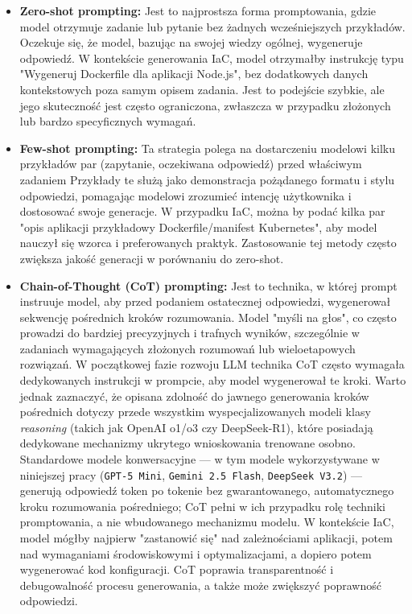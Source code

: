 \begin{itemize}
	\item \textbf{Zero-shot prompting:} Jest to najprostsza forma promptowania, gdzie model otrzymuje zadanie lub pytanie bez żadnych wcześniejszych przykładów. Oczekuje się, że model, bazując na swojej wiedzy ogólnej, wygeneruje odpowiedź. W kontekście generowania IaC, model otrzymałby instrukcję typu "Wygeneruj Dockerfile dla aplikacji Node.js", bez dodatkowych danych kontekstowych poza samym opisem zadania. Jest to podejście szybkie, ale jego skuteczność jest często ograniczona, zwłaszcza w przypadku złożonych lub bardzo specyficznych wymagań.
	\item \textbf{Few-shot prompting:} Ta strategia polega na dostarczeniu modelowi kilku przykładów par (zapytanie, oczekiwana odpowiedź) przed właściwym zadaniem \cite{brown_language_2020} Przykłady te służą jako demonstracja pożądanego formatu i stylu odpowiedzi, pomagając modelowi zrozumieć intencję użytkownika i dostosować swoje generacje. W przypadku IaC, można by podać kilka par "opis aplikacji \textrightarrow{} przykładowy Dockerfile/manifest Kubernetes", aby model nauczył się wzorca i preferowanych praktyk. Zastosowanie tej metody często zwiększa jakość generacji w porównaniu do zero-shot.
	\item \textbf{Chain-of-Thought (CoT) prompting:} Jest to technika, w której prompt instruuje model, aby przed podaniem ostatecznej odpowiedzi, wygenerował sekwencję pośrednich kroków rozumowania. Model "myśli na głos", co często prowadzi do bardziej precyzyjnych i trafnych wyników, szczególnie w zadaniach wymagających złożonych rozumowań lub wieloetapowych rozwiązań. W początkowej fazie rozwoju LLM technika CoT często wymagała dedykowanych instrukcji w prompcie, aby model wygenerował te kroki. Warto jednak zaznaczyć, że opisana zdolność do jawnego generowania kroków pośrednich dotyczy przede wszystkim wyspecjalizowanych modeli klasy \textit{reasoning} (takich jak OpenAI o1/o3 czy DeepSeek-R1), które posiadają dedykowane mechanizmy ukrytego wnioskowania trenowane osobno. Standardowe modele konwersacyjne — w tym modele wykorzystywane w niniejszej pracy (\texttt{GPT-5 Mini}, \texttt{Gemini 2.5 Flash}, \texttt{DeepSeek V3.2}) — generują odpowiedź token po tokenie bez gwarantowanego, automatycznego kroku rozumowania pośredniego; CoT pełni w ich przypadku rolę techniki promptowania, a nie wbudowanego mechanizmu modelu. W kontekście IaC, model mógłby najpierw "zastanowić się" nad zależnościami aplikacji, potem nad wymaganiami środowiskowymi i optymalizacjami, a dopiero potem wygenerować kod konfiguracji. CoT poprawia transparentność i debugowalność procesu generowania, a także może zwiększyć poprawność odpowiedzi.

\end{itemize}
